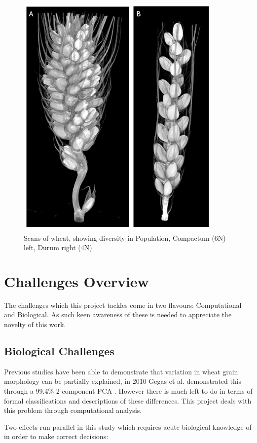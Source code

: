 \documentclass[11pt]{report}
\begin{document}
\begin{figure}[htbp]
\centering
\includegraphics[width=10cm]{./images/spikes.png}
\caption{\label{fig:org7dcf31e}
Scans of wheat, showing diversity in Population, Compactum (6N) left, Durum right (4N)}
\end{figure}

\section{Challenges Overview}
\label{sec:orgba452be}

The challenges which this project tackles come in two flavours: Computational and Biological. As such keen awareness of these is needed to appreciate the novelty of this work.

\subsection{Biological Challenges}
\label{sec:orga3e7a74}
Previous studies have been able to demonstrate that variation in wheat grain morphology can be partially explained, in 2010 Gegas et al. demonstrated this through a 99.4\% 2 component PCA \cite{Gegas2010}. However there is much left to do in terms of formal classifications and descriptions of these differences. This project deals with this problem through computational analysis.

Two effects run parallel in this study which requires acute biological knowledge of in order to make correct decisions:
\end{document}

